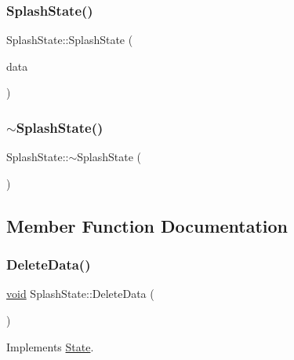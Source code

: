 \subsubsection{\texorpdfstring{Splash\+State()}{SplashState()}}
{\footnotesize\ttfamily Splash\+State\+::\+Splash\+State (\begin{DoxyParamCaption}\item[{\hyperlink{structGameData}{Game\+Data} \&}]{data }\end{DoxyParamCaption})}

\mbox{\label{classSplashState_a3171ebc16024564fced18948bf9d7ec5}} 
\subsubsection{\texorpdfstring{$\sim$\+Splash\+State()}{~SplashState()}}
{\footnotesize\ttfamily Splash\+State\+::$\sim$\+Splash\+State (\begin{DoxyParamCaption}{ }\end{DoxyParamCaption})}



\subsection{Member Function Documentation}
\mbox{\label{classSplashState_aca842c8e3ea2642980569ed3b4bb362a}} 
\subsubsection{\texorpdfstring{Delete\+Data()}{DeleteData()}}
{\footnotesize\ttfamily \hyperlink{imgui__impl__opengl3__loader_8h_ac668e7cffd9e2e9cfee428b9b2f34fa7}{void} Splash\+State\+::\+Delete\+Data (\begin{DoxyParamCaption}{ }\end{DoxyParamCaption})\hspace{0.3cm}{\ttfamily [virtual]}}



Implements \hyperlink{classState_ade502eaa386d570e526eb356ffd73fd8}{State}.

\mbox{\label{classSplashState_ae3e0604da087032c179593c237580988}} 
